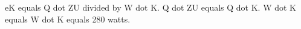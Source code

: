 eK equals Q dot ZU divided by W dot K.  
Q dot ZU equals Q dot K.  
W dot K equals W dot K equals 280 watts.